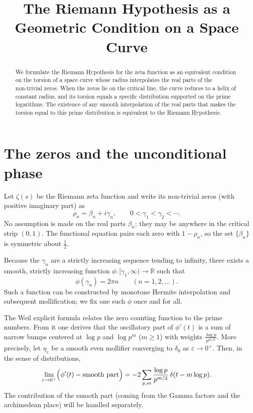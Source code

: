 \documentclass[12pt,a4paper]{article}
\title{\bf The Riemann Hypothesis as a Geometric Condition on a Space Curve}
\author{}
\date{}
\newcommand{\R}{\mathbb{R}}
\begin{document}
\maketitle

\begin{abstract}
We formulate the Riemann Hypothesis for the zeta function as an equivalent condition on the torsion of a space curve whose radius interpolates the real parts of the non‑trivial zeros.  When the zeros lie on the critical line, the curve reduces to a helix of constant radius, and its torsion equals a specific distribution supported on the prime logarithms.  The existence of any smooth interpolation of the real parts that makes the torsion equal to this prime distribution is equivalent to the Riemann Hypothesis.
\end{abstract}

\section{The zeros and the unconditional phase}

Let $\zeta(s)$ be the Riemann zeta function and write its non‑trivial zeros (with positive imaginary part) as
\[
\rho_n = \beta_n + i\gamma_n,\qquad 0<\gamma_1<\gamma_2<\cdots .
\]
No assumption is made on the real parts $\beta_n$; they may be anywhere in the critical strip $(0,1)$.  The functional equation pairs each zero with $1-\rho_n$, so the set $\{\beta_n\}$ is symmetric about $\frac12$.

Because the $\gamma_n$ are a strictly increasing sequence tending to infinity, there exists a smooth, strictly increasing function $\phi:[\gamma_1,\infty)\to\R$ such that
\[
\phi(\gamma_n)=2\pi n\qquad(n=1,2,\dots).
\]
Such a function can be constructed by monotone Hermite interpolation and subsequent mollification; we fix one such $\phi$ once and for all.

The Weil explicit formula relates the zero counting function to the prime numbers.  From it one derives that the oscillatory part of $\phi'(t)$ is a sum of narrow bumps centered at $\log p$ and $\log p^m$ ($m\ge1$) with weights $\frac{\log p}{p^{m/2}}$.  More precisely, let $\eta_\varepsilon$ be a smooth even mollifier converging to $\delta_0$ as $\varepsilon\to0^+$.  Then, in the sense of distributions,
\[
\lim_{\varepsilon\to0^+} \Bigl(\phi'(t) - \text{smooth part}\Bigr) = -2\sum_{p,m}\frac{\log p}{p^{m/2}}\,\delta(t-m\log p).
\]
The contribution of the smooth part (coming from the Gamma factors and the archimedean place) will be handled separately.
\end{document}
